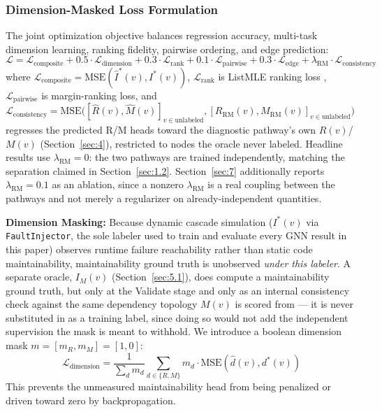 \subsubsection{Dimension-Masked Loss Formulation}

The joint optimization objective balances regression accuracy, multi-task dimension learning, ranking fidelity, pairwise ordering, and edge prediction:
\begin{equation}
\mathcal{L} = \mathcal{L}_{\text{composite}} + 0.5 \cdot \mathcal{L}_{\text{dimension}} + 0.3 \cdot \mathcal{L}_{\text{rank}} + 0.1 \cdot \mathcal{L}_{\text{pairwise}} + 0.3 \cdot \mathcal{L}_{\text{edge}} + \lambda_{\text{RM}} \cdot \mathcal{L}_{\text{consistency}}
\end{equation}
where $\mathcal{L}_{\text{composite}} = \text{MSE}(\hat{I}^*(v), I^*(v))$, $\mathcal{L}_{\text{rank}}$ is ListMLE ranking loss \cite{xia2008listwise}, $\mathcal{L}_{\text{pairwise}}$ is margin-ranking loss, and $\mathcal{L}_{\text{consistency}} = \text{MSE}\big([\hat{R}(v), \hat{M}(v)]_{v \in \text{unlabeled}}, [R_{\text{RM}}(v), M_{\text{RM}}(v)]_{v \in \text{unlabeled}}\big)$ regresses the predicted R/M heads toward the diagnostic pathway's own $R(v)$/$M(v)$ (Section~\ref{sec:4}), restricted to nodes the oracle never labeled. Headline results use $\lambda_{\text{RM}} = 0$: the two pathways are trained independently, matching the separation claimed in Section~\ref{sec:1.2}. Section~\ref{sec:7} additionally reports $\lambda_{\text{RM}} = 0.1$ as an ablation, since a nonzero $\lambda_{\text{RM}}$ is a real coupling between the pathways and not merely a regularizer on already-independent quantities.

\noindent\textbf{Dimension Masking:} Because dynamic cascade simulation ($I^*(v)$ via \texttt{FaultInjector}, the sole labeler used to train and evaluate every GNN result in this paper) observes runtime failure reachability rather than static code maintainability, maintainability ground truth is unobserved \emph{under this labeler}. A separate oracle, $I_M(v)$ (Section~\ref{sec:5.1}), does compute a maintainability ground truth, but only at the Validate stage and only as an internal consistency check against the same dependency topology $M(v)$ is scored from --- it is never substituted in as a training label, since doing so would not add the independent supervision the mask is meant to withhold. We introduce a boolean dimension mask $m = [m_R, m_M] = [1, 0]$:
\begin{equation}
\mathcal{L}_{\text{dimension}} = \frac{1}{\sum_{d} m_d} \sum_{d \in \{R, M\}} m_d \cdot \text{MSE}(\hat{d}(v), d^*(v))
\end{equation}
This prevents the unmeasured maintainability head from being penalized or driven toward zero by backpropagation.

